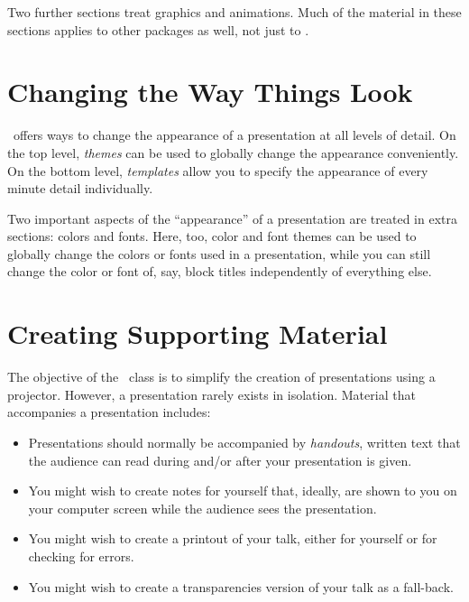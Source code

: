 \documentclass{ltxdoc}
\begin{document}
Two further sections treat graphics and animations. Much of the material in these sections applies to other packages as well, not just to \beamer.











\part{Changing the Way Things Look}

\beamer\ offers ways to change the appearance of a presentation at all levels of detail. On the top level, \emph{themes} can be used to globally change the appearance conveniently. On the bottom level, \emph{templates} allow you to specify the appearance of every minute detail individually.

Two important aspects of the ``appearance'' of a presentation are treated in extra sections: colors and fonts. Here, too, color and font themes can be used to globally change the colors or fonts used in a presentation, while you can still change the color or font of, say, block titles independently of everything else.








\part{Creating Supporting Material}

The objective of the \beamer\ class is to simplify the creation of presentations using a projector. However, a presentation rarely exists in isolation. Material that accompanies a presentation includes:
\begin{itemize}
\item
  Presentations should normally be accompanied by \emph{handouts}, written text that the audience can read during and/or after your presentation is given.
\item
  You might wish to create notes for yourself that, ideally, are shown to you on your computer screen while the audience sees the presentation.
\item
  You might wish to create a printout of your talk, either for yourself or for checking for errors.
\item
  You might wish to create a transparencies version of your talk as a fall-back.
\end{itemize}
\end{document}

